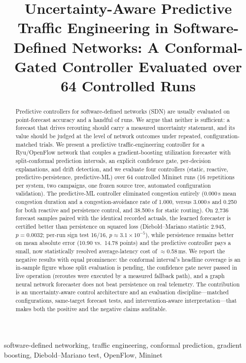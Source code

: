 \documentclass[conference]{IEEEtran}
\title{Uncertainty-Aware Predictive Traffic Engineering in
Software-Defined Networks: A Conformal-Gated Controller
Evaluated over 64 Controlled Runs}
\author{\IEEEauthorblockN{Mohit Pingale}
\IEEEauthorblockA{Department of Computer Engineering\\
Vishwakarma Institute of Technology, Pune, India}}
\begin{document}
\maketitle

\begin{abstract}
Predictive controllers for software-defined networks (SDN) are usually
evaluated on point-forecast accuracy and a handful of runs. We argue
that neither is sufficient: a forecast that drives rerouting should
carry a measured uncertainty statement, and its value should be judged
at the level of network outcomes under repeated, configuration-matched
trials. We present a predictive traffic-engineering controller for a
Ryu/OpenFlow network that couples a gradient-boosting utilization
forecaster with split-conformal prediction intervals, an explicit
confidence gate, per-decision explanations, and drift detection, and
we evaluate four controllers (static, reactive, predictive-persistence,
predictive-ML) over 64 controlled Mininet runs (16 repetitions per
system, two campaigns, one frozen source tree, automated configuration
validation). The predictive-ML controller eliminated congestion
entirely (0.000\,s mean congestion duration and a congestion-avoidance
rate of 1.000, versus 3.000\,s and 0.250 for both reactive and
persistence control, and 38.500\,s for static routing). On 2{,}736
forecast samples paired with the identical recorded actuals, the
learned forecaster is certified better than persistence on squared
loss (Diebold--Mariano statistic 2.945, $p = 0.0032$; per-run sign
test 16/16, $p \approx 3.1 \times 10^{-5}$), while persistence remains
better on mean absolute error (10.90 vs.\ 14.78 points) and the
predictive controller pays a small, now statistically resolved
average-latency cost of $\approx$0.58\,ms. We report the negative
results with equal prominence: the conformal interval's headline
coverage is an in-sample figure whose split evaluation is pending,
the confidence gate never passed in live operation (reroutes were
executed by a measured fallback path), and a graph neural network
forecaster does not beat persistence on real telemetry. The
contribution is an uncertainty-aware control architecture and an
evaluation discipline---matched configurations, same-target forecast
tests, and intervention-aware interpretation---that makes both the
positive and the negative claims auditable.
\end{abstract}

\begin{IEEEkeywords}
software-defined networking, traffic engineering, conformal
prediction, gradient boosting, Diebold--Mariano test, OpenFlow,
Mininet
\end{IEEEkeywords}
\end{document}
